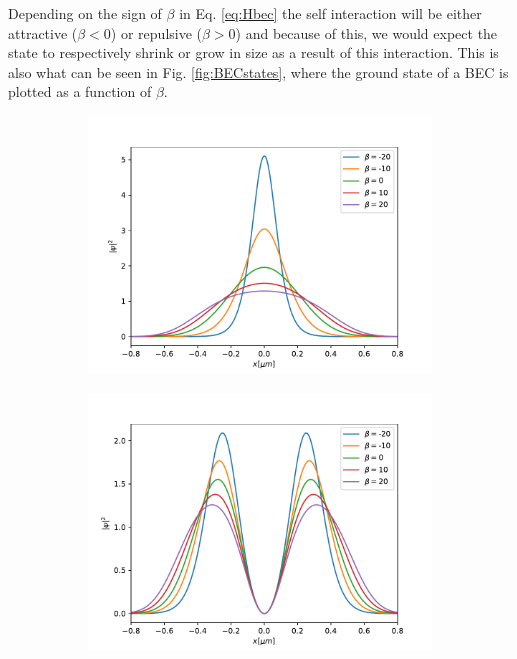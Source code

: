 \documentclass[a4paper, twocolumn]{revtex4-1}
\begin{document}
Depending on the sign of $\beta$ in Eq. \eqref{eq:Hbec} the self interaction will be either attractive ($\beta<0$) or repulsive ($\beta>0$) and because of this, we would expect the state to respectively shrink or grow in size as a result of this interaction. This is also what can be seen in Fig. \ref{fig:BECstates}, where the ground state of a BEC is plotted as a function of $\beta$.
\begin{figure}[h]
	\begin{subfigure}{\columnwidth}
		\includegraphics[width=\columnwidth]{graphics/stateAnalysis/GroundstateBeta.pdf}
	\end{subfigure}
	\begin{subfigure}{\columnwidth}
		\includegraphics[width=\columnwidth]{graphics/stateAnalysis/ExcitedstateBeta.pdf}

\end{subfigure}
\end{figure}
\end{document}
